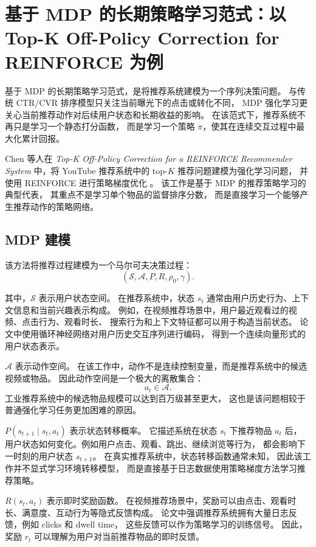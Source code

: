 \documentclass[11pt]{ctexart}
\begin{document}
\section{基于 MDP 的长期策略学习范式：以 Top-K Off-Policy Correction for REINFORCE 为例}

基于 MDP 的长期策略学习范式，是将推荐系统建模为一个序列决策问题。
与传统 CTR/CVR 排序模型只关注当前曝光下的点击或转化不同，
MDP 强化学习更关心当前推荐动作对后续用户状态和长期收益的影响。
在该范式下，推荐系统不再只是学习一个静态打分函数，
而是学习一个策略 $\pi$，使其在连续交互过程中最大化累计回报。

Chen 等人在 \textit{Top-K Off-Policy Correction for a REINFORCE Recommender System}
中，将 YouTube 推荐系统中的 top-$K$ 推荐问题建模为强化学习问题，
并使用 REINFORCE 进行策略梯度优化 \cite{chen2019topk}。
该工作是基于 MDP 的推荐策略学习的典型代表，
其重点不是学习单个物品的监督排序分数，
而是直接学习一个能够产生推荐动作的策略网络。

\subsection{MDP 建模}

该方法将推荐过程建模为一个马尔可夫决策过程：
\[
(\mathcal{S},\mathcal{A},P,R,\rho_0,\gamma).
\]

其中，$\mathcal{S}$ 表示用户状态空间。
在推荐系统中，状态 $s_t$ 通常由用户历史行为、上下文信息和当前兴趣表示构成。
例如，在视频推荐场景中，用户最近观看过的视频、点击行为、观看时长、
搜索行为和上下文特征都可以用于构造当前状态。
论文中使用循环神经网络对用户历史交互序列进行编码，
得到一个连续向量形式的用户状态表示。

$\mathcal{A}$ 表示动作空间。
在该工作中，动作不是连续控制变量，而是推荐系统中的候选视频或物品。
因此动作空间是一个极大的离散集合：
\[
a_t \in \mathcal{A}.
\]
工业推荐系统中的候选物品规模可以达到百万级甚至更大，
这也是该问题相较于普通强化学习任务更加困难的原因。

$P(s_{t+1}\mid s_t,a_t)$ 表示状态转移概率。
它描述系统在状态 $s_t$ 下推荐物品 $a_t$ 后，
用户状态如何变化。例如用户点击、观看、跳出、继续浏览等行为，
都会影响下一时刻的用户状态 $s_{t+1}$。
在真实推荐系统中，状态转移函数通常未知，
因此该工作并不显式学习环境转移模型，
而是直接基于日志数据使用策略梯度方法学习推荐策略。

$R(s_t,a_t)$ 表示即时奖励函数。
在视频推荐场景中，奖励可以由点击、观看时长、满意度、互动行为等隐式反馈构成。
论文中强调推荐系统拥有大量日志反馈，例如 clicks 和 dwell time，
这些反馈可以作为策略学习的训练信号。
因此，奖励 $r_t$ 可以理解为用户对当前推荐物品的即时反馈。
\end{document}
